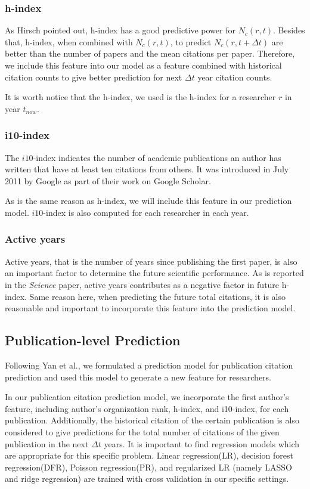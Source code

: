 \subsubsection{h-index}
As Hirsch pointed out\cite{hirsch2007does}, h-index has a good predictive power for $N_c(r,t)$.
Besides that, h-index, when combined with $N_c(r,t)$, to predict $N_c(r,t+\Delta t)$ are better than the number of papers and the mean citations per paper.
Therefore, we include this feature into our model as a feature combined with historical citation counts to give better prediction for next $\Delta t$ year citation counts.

It is worth notice that the h-index, we used is the h-index for a researcher $r$ in year $t_{now}$.

\subsubsection{i10-index}
The $i10$-index indicates the number of academic publications an author has written that have at least ten citations from others.
It was introduced in July 2011 by Google as part of their work on Google Scholar.\cite{delgado2014google}

As is the same reason as h-index, we will include this feature in our prediction model. $i10$-index is also computed for each researcher in each year.

\subsubsection{Active years}
Active years, that is the number of years since publishing the first paper, is also an important factor to determine the future scientific performance.
As is reported in the {\it Science} paper\cite{acuna2012future}, active years contributes as a negative factor in future h-index.
Same reason here, when predicting the future total citations, it is also reasonable and important to incorporate this feature into the prediction model.

\subsection{Publication-level Prediction}
Following Yan et al.\cite{yan2011citation}, we formulated a prediction model for publication citation prediction and used this model to generate a new feature for researchers.

In our publication citation prediction model, we incorporate the first author's feature, including author's organization rank, h-index, and i10-index, for each publication.
Additionally, the historical citation of the certain publication is also considered to give predictions for the total number of citations of the given publication in the next $\Delta t$ years.
It is important to find regression models which are appropriate for this specific problem.
Linear regression(LR), decision forest regression(DFR), Poisson regression(PR), and regularized LR (namely LASSO and ridge regression) are trained with cross validation in our specific settings.


